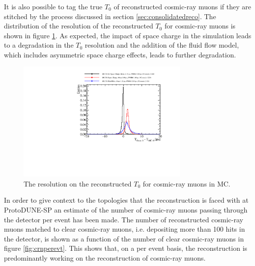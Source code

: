 It is also possible to tag the true $T_{0}$ of reconstructed cosmic-ray muons if they are stitched by the process discussed in section \ref{sec:consolidatedreco}.  The distribution of the resolution of the reconstructed $T_{0}$ for cosmic-ray muons is shown in figure \ref{fig:crt0res}.  As expected, the impact of space charge  in the simulation leads to a degradation in the $T_{0}$ resolution and the addition of the fluid flow model, which includes asymmetric space charge effects, leads to further degradation.  

\begin{figure}
\centering
\includegraphics[width=0.75\textwidth]{Figures/Metrics/MC/Cosmics/CosmicRayT0Resolustion.pdf}
\caption{The resolution on the reconstructed $T_{0}$ for cosmic-ray muons in MC.}
\label{fig:crt0res}
\end{figure}

In order to give context to the topologies that the reconstruction is faced with at ProtoDUNE-SP an estimate of the number of cosmic-ray muons passing through the detector per event has been made.  The number of reconstructed cosmic-ray muons matched to clear cosmic-ray muons, i.e. depositing more than 100 hits in the detector, is shown as a function of the number of clear cosmic-ray muons in figure \ref{fig:crnperevt}.  This shows that, on a per event basis, the reconstruction is predominantly working on the reconstruction of cosmic-ray muons.

